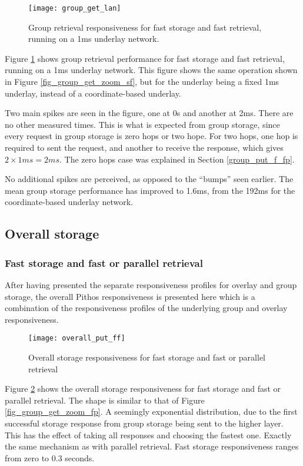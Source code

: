 \begin{figure}[htbp]
 \centering
 \texttt{[image: group\_get\_lan]}
 \caption{Group retrieval responsiveness for fast storage and fast retrieval, running on a 1ms underlay network.}
 \label{fig_group_get_lan}
\end{figure}
%
Figure \ref{fig_group_get_lan} shows group retrieval performance for fast storage and fast retrieval, running on a 1ms underlay network. This figure shows the same operation shown in Figure \ref{fig_group_get_zoom_sf}, but for the underlay being a fixed 1ms underlay, instead of a coordinate-based underlay.

Two main spikes are seen in the figure, one at 0s and another at 2ms. There are no other measured times. This is what is expected from group storage, since every request in group storage is zero hops or two hope. For two hops, one hop is required to sent the request, and another to receive the response, which gives $2\times 1 ms = 2 ms$. The zero hops case was explained in Section \ref{group_put_f_fp}.

No additional spikes are perceived, as opposed to the ``bumps'' seen earlier. The mean group storage performance has improved to 1.6ms, from the 192ms for the coordinate-based underlay network.

\subsection{Overall storage}

\subsubsection{Fast storage and fast or parallel retrieval}
After having presented the separate responsiveness profiles for overlay and group storage, the overall Pithos responsiveness is presented here which is a combination of the responsiveness profiles of the underlying group and overlay responsiveness.

\begin{figure}[htbp]
 \centering
 \texttt{[image: overall\_put\_ff]}
 \caption{Overall storage responsiveness for fast storage and fast or parallel retrieval}
 \label{fig_overall_put_ff}
\end{figure}
%
Figure \ref{fig_overall_put_ff} shows the overall storage responsiveness for fast storage and fast or parallel retrieval. The shape is similar to that of Figure \ref{fig_group_get_zoom_fp}. A seemingly exponential distribution, due to the first successful storage response from group storage being sent to the higher layer. This has the effect of taking all responses and choosing the fastest one. Exactly the same mechanism as with parallel retrieval. Fast storage responsiveness ranges from zero to 0.3 seconds.

